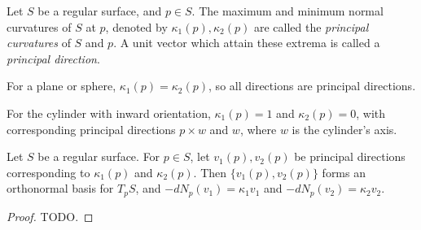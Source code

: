 \begin{defn}
    Let $S$ be a regular surface, and $p \in S$. The maximum and minimum normal curvatures of $S$ at $p$, denoted by $\kappa_1(p), \kappa_2(p)$ are called the \emph{principal curvatures} of $S$ and $p$. A unit vector which attain these extrema is called a \emph{principal direction}.
\end{defn}

\begin{defn}
    For a plane or sphere, $\kappa_1(p) = \kappa_2(p)$, so all directions are principal directions.

    For the cylinder with inward orientation, $\kappa_1(p) = 1$ and $\kappa_2(p) = 0$, with corresponding principal directions $p \times w$ and $w$, where $w$ is the cylinder's axis.
\end{defn}

\begin{thm}\label{thm:principal-directions-gauss-eigenvectors}
    Let $S$ be a regular surface. For $p \in S$, let $v_1(p), v_2(p)$ be principal directions corresponding to $\kappa_1(p)$ and $\kappa_2(p)$. Then $\{v_1(p), v_2(p)\}$ forms an orthonormal basis for $T_pS$, and $-dN_p(v_1) = \kappa_1v_1$ and $-dN_p(v_2) = \kappa_2v_2$.
\end{thm}

\begin{proof}
    {\color{red}TODO.}
\end{proof}
